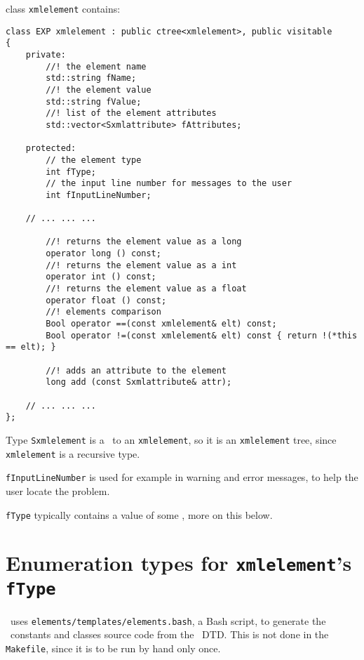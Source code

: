 class   {\tt xmlelement} contains:
\begin{lstlisting}[language=CPlusPlus]
class EXP xmlelement : public ctree<xmlelement>, public visitable
{
	private:
		//! the element name
		std::string fName;
		//! the element value
		std::string fValue;
		//! list of the element attributes
		std::vector<Sxmlattribute> fAttributes;

	protected:
		// the element type
		int fType;
		// the input line number for messages to the user
		int fInputLineNumber;

	// ... ... ...

		//! returns the element value as a long
		operator long () const;
		//! returns the element value as a int
		operator int () const;
		//! returns the element value as a float
		operator float () const;
		//! elements comparison
		Bool operator ==(const xmlelement& elt) const;
		Bool operator !=(const xmlelement& elt) const { return !(*this == elt); }

		//! adds an attribute to the element
		long add (const Sxmlattribute& attr);

	// ... ... ...
};
\end{lstlisting}

Type {\tt Sxmlelement} is a \smart\ to an {\tt xmlelement}, so it is an {\tt xmlelement} tree, since {\tt xmlelement} is a recursive type.

{\tt fInputLineNumber} is used for example in warning and error messages, to help the user locate the problem.

{\tt fType} typically contains a value of some \enumType, more on this below.


\section{Enumeration types for {\tt xmlelement}'s {\tt fType}}

\libmusicxml\ uses {\tt elements/templates/elements.bash}, a Bash script, to generate the \enumType\ constants and classes source code from the \mxml\ DTD. This is not done in the {\tt Makefile}, since it is to be run by hand only once.

